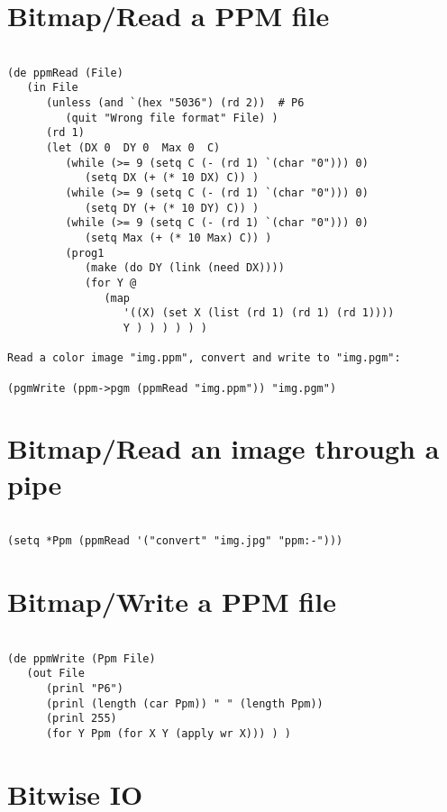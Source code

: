 \section*{Bitmap/Read a PPM file}

\begin{verbatim}

(de ppmRead (File)
   (in File
      (unless (and `(hex "5036") (rd 2))  # P6
         (quit "Wrong file format" File) )
      (rd 1)
      (let (DX 0  DY 0  Max 0  C)
         (while (>= 9 (setq C (- (rd 1) `(char "0"))) 0)
            (setq DX (+ (* 10 DX) C)) )
         (while (>= 9 (setq C (- (rd 1) `(char "0"))) 0)
            (setq DY (+ (* 10 DY) C)) )
         (while (>= 9 (setq C (- (rd 1) `(char "0"))) 0)
            (setq Max (+ (* 10 Max) C)) )
         (prog1
            (make (do DY (link (need DX))))
            (for Y @
               (map
                  '((X) (set X (list (rd 1) (rd 1) (rd 1))))
                  Y ) ) ) ) ) )

Read a color image "img.ppm", convert and write to "img.pgm":

(pgmWrite (ppm->pgm (ppmRead "img.ppm")) "img.pgm")

\end{verbatim}

\section*{Bitmap/Read an image through a pipe}

\begin{verbatim}

(setq *Ppm (ppmRead '("convert" "img.jpg" "ppm:-")))

\end{verbatim}

\section*{Bitmap/Write a PPM file}

\begin{verbatim}

(de ppmWrite (Ppm File)
   (out File
      (prinl "P6")
      (prinl (length (car Ppm)) " " (length Ppm))
      (prinl 255)
      (for Y Ppm (for X Y (apply wr X))) ) )

\end{verbatim}

\section*{Bitwise IO}

